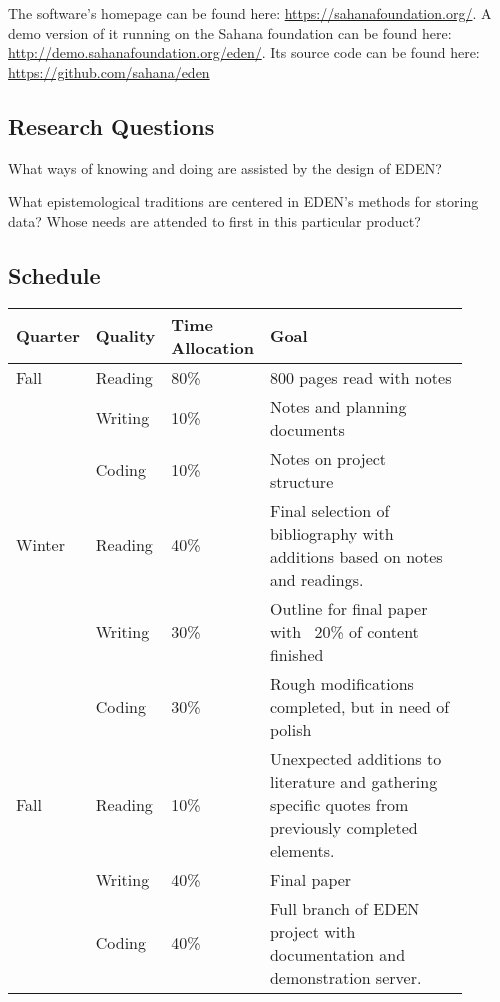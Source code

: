 \documentclass[a4paper,man,natbib]{apa6}
\begin{document}
   The software's homepage can be found here: \url{https://sahanafoundation.org/}. A demo version of it running on the Sahana foundation can be found here: \url{http://demo.sahanafoundation.org/eden/}. Its source code can be found here: \url{https://github.com/sahana/eden}
   \subsection*{Research Questions}
   What ways of knowing and doing are assisted by the design of EDEN?

   What epistemological traditions are centered in EDEN's methods for storing data? Whose needs are attended to first in this particular product?
   \subsection*{Schedule}
   \begin{center}
   \begin{tabular}{|l|p{0.1\linewidth}|p{0.1\linewidth}|p{0.7\linewidth}|}
   \hline
   Quarter & Quality & Time Allocation & Goal                         \\ \hline
   Fall    & Reading & 80\%            & 800 pages read with notes    \\ \cline{2-4} 
           & Writing & 10\%            & Notes and planning documents \\ \cline{2-4} 
           & Coding  & 10\%            & Notes on project structure   \\ \hline 
   Winter  & Reading & 40\%            & Final selection of bibliography with additions based on notes and readings.   \\ \cline{2-4} 
           & Writing & 30\%            & Outline for final paper with ~20\% of content finished \\ \cline{2-4} 
           & Coding  & 30\%            & Rough modifications completed, but in need of polish  \\ \hline
   Fall    & Reading & 10\%            & Unexpected additions to literature and gathering specific quotes from previously completed elements.   \\ \cline{2-4} 
           & Writing & 40\%            & Final paper \\ \cline{2-4}
           & Coding  & 40\%            & Full branch of EDEN project with documentation and demonstration server. \\ \hline
   \end{tabular}
   \end{center}
\end{document}
